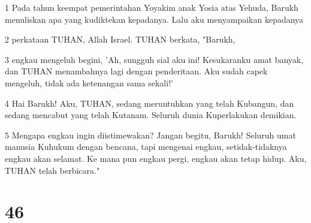 \par 1 Pada tahun keempat pemerintahan Yoyakim anak Yosia atas Yehuda, Barukh menuliskan apa yang kudiktekan kepadanya. Lalu aku menyampaikan kepadanya
\par 2 perkataan TUHAN, Allah Israel. TUHAN berkata, "Barukh,
\par 3 engkau mengeluh begini, 'Ah, sungguh sial aku ini! Kesukaranku amat banyak, dan TUHAN menambahnya lagi dengan penderitaan. Aku sudah capek mengeluh, tidak ada ketenangan sama sekali!'
\par 4 Hai Barukh! Aku, TUHAN, sedang meruntuhkan yang telah Kubangun, dan sedang mencabut yang telah Kutanam. Seluruh dunia Kuperlakukan demikian.
\par 5 Mengapa engkau ingin diistimewakan? Jangan begitu, Barukh! Seluruh umat manusia Kuhukum dengan bencana, tapi mengenai engkau, setidak-tidaknya engkau akan selamat. Ke mana pun engkau pergi, engkau akan tetap hidup. Aku, TUHAN telah berbicara."

\chapter{46}

